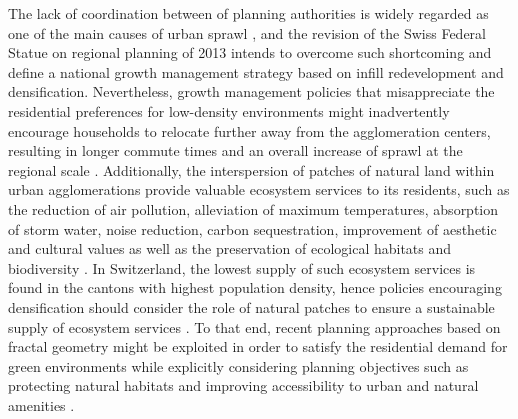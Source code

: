 \documentclass[10pt,letterpaper]{article}
\begin{document}
The lack of coordination between of planning authorities is widely regarded as one of the main causes of urban sprawl \cite{carruthers2002fragmentation, mann2009institutional}, and the revision of the Swiss Federal Statue on regional planning of 2013 intends to overcome such shortcoming and define a national growth management strategy based on infill redevelopment and densification.
Nevertheless, growth management policies that misappreciate the residential preferences for low-density environments might inadvertently encourage households to relocate further away from the agglomeration centers, resulting in longer commute times and an overall increase of sprawl at the regional scale \cite{schwanen2004policies, robinson2005twenty}.
Additionally, the interspersion of patches of natural land within urban agglomerations provide valuable ecosystem services to its residents, such as the reduction of air pollution, alleviation of maximum temperatures, absorption of storm water, noise reduction, carbon sequestration, improvement of aesthetic and cultural values as well as the preservation of ecological habitats and biodiversity \cite{bolund1999ecosystem, gomez2013classifying}.
In Switzerland, the lowest supply of such ecosystem services is found in the cantons with highest population density, hence policies encouraging densification should consider the role of natural patches to ensure a sustainable supply of ecosystem services \cite{jaligot2019historical}.
To that end, recent planning approaches based on fractal geometry \cite{yamu2015spatial} might be exploited in order to satisfy the residential demand for green environments while explicitly considering planning objectives such as protecting natural habitats and improving accessibility to urban and natural amenities \cite{bosch2019addressing}.
\end{document}
